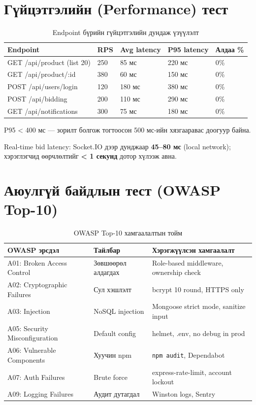 \documentclass[12pt, a4paper]{report}
\begin{document}
\section{Гүйцэтгэлийн (Performance) тест}

\begin{table}[H]
  \centering
  \caption{Endpoint бүрийн гүйцэтгэлийн дундаж үзүүлэлт}
  \label{tab:performance}
  \begin{tabularx}{\textwidth}{L{5cm}C{2cm}C{2.5cm}C{2.5cm}C{2cm}}
    \toprule
    \textbf{Endpoint} & \textbf{RPS} & \textbf{Avg latency} & \textbf{P95 latency} & \textbf{Алдаа \%} \\
    \midrule
    GET /api/product (list 20) & 250 & 85 мс & 220 мс & 0\% \\
    GET /api/product/:id & 380 & 60 мс & 150 мс & 0\% \\
    POST /api/users/login & 120 & 180 мс & 380 мс & 0\% \\
    POST /api/bidding & 200 & 110 мс & 290 мс & 0\% \\
    GET /api/notifications & 300 & 75 мс & 180 мс & 0\% \\
    \bottomrule
  \end{tabularx}
\end{table}

P95 < 400 мс — зорилт болгож тогтоосон 500 мс-ийн хязгааравас доогуур байна.

Real-time bid latency: Socket.IO дээр дунджаар \textbf{45--80 мс} (local network); хэрэглэгчид өөрчлөлтийг \textbf{< 1 секунд} дотор хүлээж авна.

\section{Аюулгүй байдлын тест (OWASP Top-10)}

\begin{table}[H]
  \centering
  \caption{OWASP Top-10 хамгаалалтын тойм}
  \label{tab:owasp}
  \begin{tabularx}{\textwidth}{L{3.5cm}L{4cm}L{6cm}}
    \toprule
    \textbf{OWASP эрсдэл} & \textbf{Тайлбар} & \textbf{Хэрэгжүүлсэн хамгаалалт} \\
    \midrule
    A01: Broken Access Control & Зөвшөөрөл алдагдах & Role-based middleware, ownership check \\
    A02: Cryptographic Failures & Сул хэшлэлт & bcrypt 10 round, HTTPS only \\
    A03: Injection & NoSQL injection & Mongoose strict mode, sanitize input \\
    A05: Security Misconfiguration & Default config & helmet, .env, no debug in prod \\
    A06: Vulnerable Components & Хуучин npm & \texttt{npm audit}, Dependabot \\
    A07: Auth Failures & Brute force & express-rate-limit, account lockout \\
    A09: Logging Failures & Аудит дутагдал & Winston logs, Sentry \\
    \bottomrule
  \end{tabularx}
\end{table}
\end{document}
